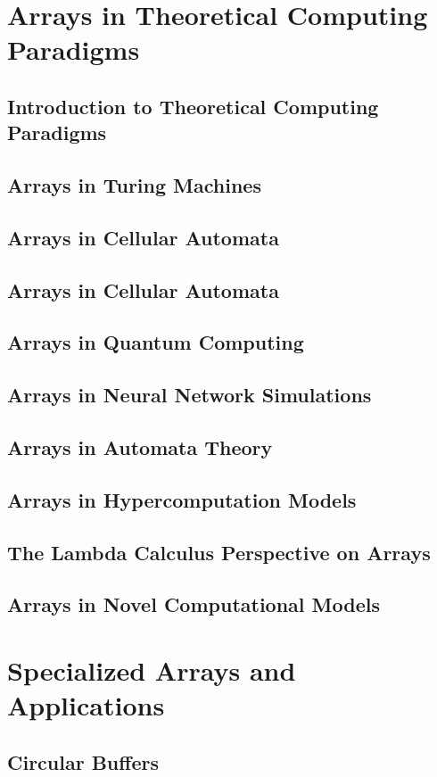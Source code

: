 \documentclass[12pt, oneside]{book}
\begin{document}
	\chapter{Arrays in Theoretical Computing Paradigms}
	
	\section{Introduction to Theoretical Computing Paradigms}
	\section{Arrays in Turing Machines}
	\section{Arrays in Cellular Automata}
	\section{Arrays in Cellular Automata}
	\section{Arrays in Quantum Computing}
	\section{Arrays in Neural Network Simulations}
	\section{Arrays in Automata Theory}
	\section{Arrays in Hypercomputation Models}
	\section{The Lambda Calculus Perspective on Arrays}
	\section{Arrays in Novel Computational Models}
	
	\chapter{Specialized Arrays and Applications}
	\section{Circular Buffers}
\end{document}
